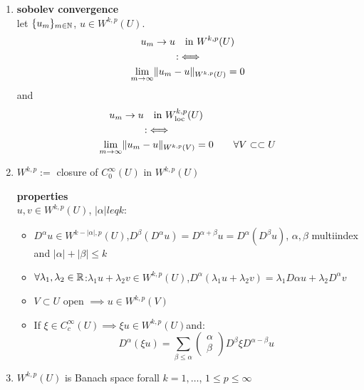 \begin{enumerate}[label=(\alph*)]
	\item \textbf{sobolev convergence}\\
	let $\{u_m\}_{m\in \mathbb{N}}$, $u \in W^{k,p}(U)$. 
	\begin{align*}
		& \quad u_m \to u \quad \text{in } W^{k,p}(U)\\
		& \hspace{1.5cm}:\iff \\
		&\underset{m \to \infty}{\lim} \|u_m -u\|_{W^{k,p}(U)} = 0
	\end{align*}
	and
	\begin{align*}
	& \quad u_m \to u \quad \text{in } W^{k,p}_{\text{loc}}(U)\\
	& \hspace{1.5cm}:\iff \\
	&\underset{m \to \infty}{\lim} \|u_m -u\|_{W^{k,p}(V)} = 0 \qquad \forall V \subset\subset U
	\end{align*}
	
	\item $W^{k,p}:=$ closure of $C^\infty_0(U)$ in $W^{k,p}(U)$
	
	\textbf{properties}\\
	$u,v \in W^{k,p}(U)$, $|\alpha| leq k$:
	\begin{itemize}
		\item $D^{\alpha} u \in W^{k-|\alpha|,p}(U)$,\quad $D^{\beta}(D^{\alpha}u) = D^{\alpha+\beta}u =  D^{\alpha}(D^{\beta}u) $, $\alpha, \beta$ multiindex and $|\alpha| + |\beta| \leq k$
		\item $\forall \lambda_1, \lambda_2 \in \mathbb{R}$:\quad $\lambda_1 u +\lambda_2 v \in W^{k,p}(U)$,\quad $D^{\alpha}(\lambda_1 u +\lambda_2 v) = \lambda_1 D{\alpha}u + \lambda_2 D^{\alpha}v$
		\item $V \subset U$ open $\implies u \in W^{k,p}(V)$
		\item If $\xi \in C^\infty_c(U) \implies \xi u \in W^{k,p}(U)$\quad  and:
		\begin{equation*}
			D^{\alpha}(\xi u) = \displaystyle \sum_{\beta \leq \alpha}
			\begin{pmatrix}
			\alpha\\
			\beta
			\end{pmatrix} 
			D^{\beta}\xi D^{\alpha -\beta} u
		\end{equation*}
	\end{itemize}
	
	\item $W^{k,p}(U)$ is Banach space forall $k=1,\dots$, $1\leq p \leq \infty$
	
	
\end{enumerate}

